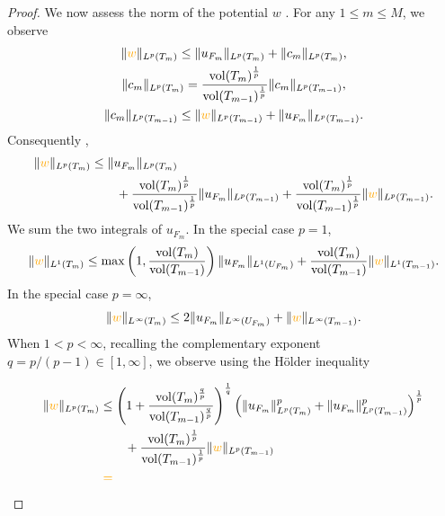 \documentclass[10pt,letterpaper]{article}
\newcommand\cye[1]{%
  \protect\leavevmode
  \begingroup
    \color{red!35!yellow}%
    #1%
  \endgroup
}
\begin{document}
\begin{proof}
 
 We \cye{now} assess the norm of the potential \cye{$w$}. \cye{For any $1 \leq m \leq M$,} we observe 
 \begin{gather*}
    \| \cye{w} \|_{L^{p}(T_m)}
    \leq 
    \| u_{F_m} \|_{L^{p}(T_m)}
    +
    \| c_{m} \|_{L^{p}(T_m)},
    \\
    \| c_{m} \|_{L^{p}(T_m)}
    = 
    \frac{ \vol(T_m)^{\frac 1 p} }{ \vol(T_{{m-1}})^{\frac 1 p} }
    \| c_{m} \|_{L^{p}(T_{{m-1}})},
    \\ 
    \| c_{m} \|_{L^{p}(T_{{m-1}})}
    \leq 
    \| \cye{w}\|_{L^{p}(T_{{m-1}})} + \| u_{F_{m}} \|_{L^{p}(T_{{m-1}})} 
    .
 \end{gather*}
 \cye{Consequently},
 \begin{align*}
    \| \cye{w} \|_{L^{p}(T_m)}
    &
    \leq 
    \| u_{F_m} \|_{L^{p}(T_m)}
    \\&\qquad 
    +
    \frac{ \vol(T_m)^{\frac 1 p} }{ \vol(T_{{m-1}})^{\frac 1 p} }
    \| u_{F_{m}} \|_{L^{p}(T_{{m-1}})}
    +
    \frac{ \vol(T_m)^{\frac 1 p} }{ \vol(T_{{m-1}})^{\frac 1 p} }
    \| \cye{w}\|_{L^{p}(T_{{m-1}})}
    .
 \end{align*}
 We sum the two integrals of $u_{F_m}$. 
 In the special case $p=1$,
 \begin{align*}
    \| \cye{w} \|_{L^{1}(T_m)}
    \leq 
    \max\left(
        1, \frac{ \vol(T_m) }{ \vol(T_{{m-1}}) } 
    \right)
    \| u_{F_m} \|_{L^{1}(U_{F_m})}
    +
    \frac{ \vol(T_m) }{ \vol(T_{{m-1}}) }
    \| \cye{w}\|_{L^{1}(T_{{m-1}})}
    .
 \end{align*}
 In the special case $p=\infty$, 
 \begin{align*}
    \| \cye{w} \|_{L^{\infty}(T_m)}
    \leq 
    2
    \| u_{F_m} \|_{L^{\infty}(U_{F_m})}
    +
    \| \cye{w}\|_{L^{\infty}(T_{{m-1}})}
    .
 \end{align*}
 When $1 < p < \infty$, \cye{recalling the complementary exponent} $q = p/(p-1) \in [1,\infty]$, we observe \cye{using the H\"older inequality}
 \begin{align*}
    \| \cye{w} \|_{L^{p}(T_m)}
    &\leq 
    \left( 1 + \frac{ \vol(T_m)^{\frac q p} }{ \vol(T_{{m-1}})^{\frac q p} } \right)^{\frac 1 q}
    \left( 
        \| u_{F_m} \|_{L^{p}(T_m)}^{p}
        +
        \| u_{F_{m}} \|_{L^{p}(T_{{m-1}})}^{p}
    \right)^{\frac 1 p}
    \\&\qquad 
    +
    \frac{ \vol(T_m)^{\frac 1 p} }{ \vol(T_{{m-1}})^{\frac 1 p} }
    \| \cye{w}\|_{L^{p}(T_{{m-1}})}
    \\&\cye{=} 

\end{align*}
\end{proof}
\end{document}
